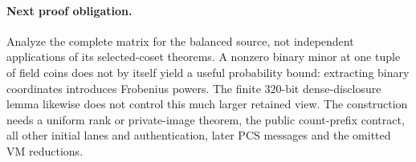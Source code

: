 \paragraph{Next proof obligation.} Analyze the complete matrix for the balanced source, not independent applications of its selected-coset theorems. A nonzero binary minor at one tuple of field coins does not by itself yield a useful probability bound: extracting binary coordinates introduces Frobenius powers. The finite $320$-bit dense-disclosure lemma likewise does not control this much larger retained view. The construction needs a uniform rank or private-image theorem, the public count-prefix contract, all other initial lanes and authentication, later PCS messages and the omitted VM reductions.
